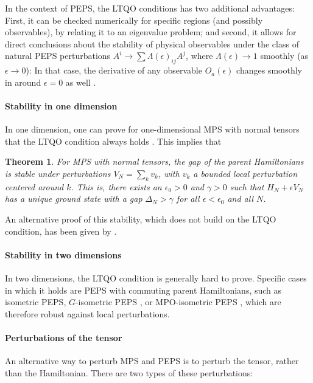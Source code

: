 \documentclass[rmp,aps,reprint,superscriptaddress,nobalancelastpage]{revtex4-1}
\newtheorem{thm}{Theorem}[section]
\begin{document}
In the context of PEPS, the LTQO conditions has two additional advantages: First, it can be checked numerically for specific regions (and possibly observables), by relating it to an eigenvalue problem; and second, it allows for direct conclusions about the stability of physical observables under the class of natural PEPS perturbations $A^i\to \sum\Lambda(\epsilon)_{ij}A^j$, where $\Lambda(\epsilon)\to1$ smoothly (as $\epsilon\to0$): In that case, the derivative of any observable $O_a(\epsilon)$ changes smoothly in around $\epsilon=0$ as well \cite{cirac:itb}.



\paragraph{Stability in one dimension} In one dimension, one can prove for one-dimensional MPS with normal tensors that the LTQO condition always holds \cite{cirac:itb}.  This implies that
\begin{thm}
    For MPS with normal tensors, the gap of the parent Hamiltonians is stable under perturbations $V_N=\sum_k v_k$, with $v_k$ a bounded local perturbation centered around $k$. This is, there exists an $\epsilon_0>0$ and $\gamma>0$ such that $H_N+\epsilon V_N$ has a unique ground state with a gap $\Delta_N>\gamma$ for all $\epsilon<\epsilon_0$ and all $N$.
\end{thm}

An alternative proof of this stability, which does not build on the LTQO condition, has been given by \textcite{szehr:gap-stability-1D}.

\paragraph{Stability in two dimensions}

In two dimensions, the LTQO condition is generally hard to prove.  Specific cases in which it holds are PEPS with commuting parent Hamiltonians, such as isometric PEPS, $G$-isometric PEPS \cite{schuch:peps-sym}, or MPO-isometric PEPS \cite{sahinoglu:mpo-injectivity}, which are therefore robust against local perturbations.

\paragraph{Perturbations of the tensor}

An alternative way to perturb MPS and PEPS is to perturb the tensor, rather than the Hamiltonian.  There are two types of these perturbations:
\end{document}
